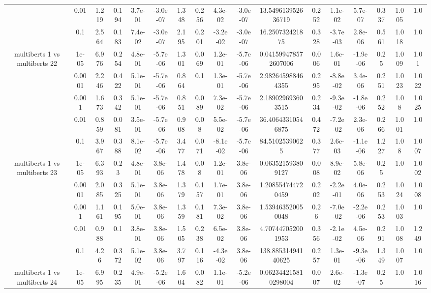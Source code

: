 \begin{tabular}{|c|c|c|c|c|c|c|c|c|c|c|c|c|c|c|c|c|}
 & 0.01 & 1.219 & 0.194 & 3.7e-01 & -3.0e-07 & 1.348 & 0.256 & 4.3e-02 & -3.0e-07 & 13.549613952636719 & 0.252 & 1.1e-02 & 5.7e-07 & 0.337 & 1.005 & 1.0 \\
 & 0.1 & 2.564 & 0.183 & 7.4e-02 & -3.0e-07 & 2.195 & 0.201 & -3.2e-02 & -3.0e-07 & 16.250732421875 & 0.328 & -3.7e-03 & 2.8e-06 & 0.561 & 1.018 & 1.0 \\
\hline
\multirow{5}{*}{multiberts 1 vs multiberts 22} & 1e-05 & 6.976 & 0.254 & 4.8e-01 & -5.7e-06 & 1.301 & 0.069 & 1.2e-01 & -5.7e-06 & 0.041599478572607006 & 0.006 & 1.6e-01 & -1.9e-06 & 0.25 & 1.009 & 1.01 \\
 & 0.0001 & 2.246 & 0.422 & 5.1e-01 & -5.7e-06 & 0.864 & 0.1 & 1.3e-01 & -5.7e-06 & 2.982645988464355 & 0.295 & -8.8e-02 & 3.4e-06 & 0.251 & 1.023 & 1.022 \\
 & 0.001 & 1.673 & 0.342 & 5.1e-01 & -5.7e-06 & 0.851 & 0.089 & 7.3e-02 & -5.7e-06 & 2.189029693603515 & 0.234 & -9.3e-02 & -1.8e-06 & 0.252 & 1.08 & 1.025 \\
 & 0.01 & 0.859 & 0.081 & 3.5e-01 & -5.7e-06 & 0.908 & 0.08 & 5.5e-02 & -5.7e-06 & 36.40643310546875 & 0.472 & -7.2e-02 & 2.3e-06 & 0.266 & 1.001 & 1.0 \\
 & 0.1 & 3.967 & 0.388 & 8.1e-02 & -5.7e-06 & 3.477 & 0.071 & -8.1e-02 & -5.7e-06 & 84.51025390625 & 0.377 & 2.6e-03 & -1.1e-06 & 1.227 & 1.08 & 1.007 \\
\hline
\multirow{5}{*}{multiberts 1 vs multiberts 23} & 1e-05 & 6.393 & 0.23 & 4.8e-01 & 3.8e-06 & 1.478 & 0.08 & 1.2e-01 & 3.8e-06 & 0.063521593809127 & 0.008 & 8.9e-02 & 5.8e-06 & 0.25 & 1.0 & 1.002 \\
 & 0.0001 & 2.085 & 0.325 & 5.1e-01 & 3.8e-06 & 1.379 & 0.157 & 1.7e-01 & 3.8e-06 & 1.208554744720459 & 0.202 & -2.2e-01 & 4.0e-06 & 0.253 & 1.024 & 1.008 \\
 & 0.001 & 1.161 & 0.195 & 5.0e-01 & 3.8e-06 & 1.359 & 0.181 & 7.3e-02 & 3.8e-06 & 1.539463520050048 & 0.26 & -7.0e-02 & -2.2e-06 & 0.253 & 1.003 & 1.0 \\
 & 0.01 & 0.988 & 0.1 & 3.8e-01 & 3.8e-06 & 1.505 & 0.238 & 6.5e-02 & 3.8e-06 & 4.707447052001953 & 0.356 & -2.1e-02 & 4.5e-06 & 0.291 & 1.008 & 1.249 \\
 & 0.1 & 4.26 & 0.372 & 5.1e-02 & 3.8e-06 & 3.797 & 0.116 & -4.3e-02 & 3.8e-06 & 138.88531494140625 & 0.257 & 1.3e-01 & -9.3e-06 & 1.349 & 1.007 & 1.0 \\
\hline
\multirow{5}{*}{multiberts 1 vs multiberts 24} & 1e-05 & 6.995 & 0.235 & 4.9e-01 & -5.2e-06 & 1.604 & 0.082 & 1.1e-01 & -5.2e-06 & 0.062344215810298004 & 0.007 & 2.6e-02 & -1.3e-07 & 0.25 & 1.0 & 1.016 \\

\end{tabular}
